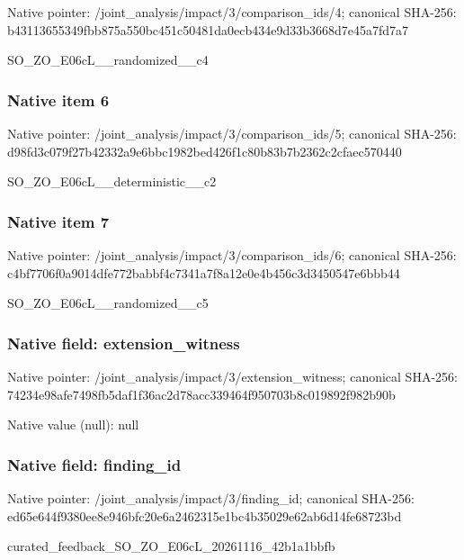\documentclass[10pt,a4paper]{article}
\begin{document}
Native pointer: /joint\_analysis/impact/3\allowbreak{}/comparison\_ids/4; canonical SHA-256: b43113655349fbb875a550bc\allowbreak{}451c50481da0ecb434e9d33b\allowbreak{}3668d7e45a7fd7a7


SO\_ZO\_E06cL\_\_randomized\_\_c4


\subsubsection{Native item 6}


Native pointer: /joint\_analysis/impact/3\allowbreak{}/comparison\_ids/5; canonical SHA-256: d98fd3c079f27b42332a9e6b\allowbreak{}bc1982bed426f1c80b83b7b2\allowbreak{}362c2cfaec570440


SO\_ZO\_E06cL\_\_deterministic\_\_c2


\subsubsection{Native item 7}


Native pointer: /joint\_analysis/impact/3\allowbreak{}/comparison\_ids/6; canonical SHA-256: c4bf7706f0a9014dfe772bab\allowbreak{}bf4c7341a7f8a12e0e4b456c\allowbreak{}3d3450547e6bbb44


SO\_ZO\_E06cL\_\_randomized\_\_c5


\subsubsection{Native field: extension\_witness}


Native pointer: /joint\_analysis/impact/3\allowbreak{}/extension\_witness; canonical SHA-256: 74234e98afe7498fb5daf1f3\allowbreak{}6ac2d78acc339464f950703b\allowbreak{}8c019892f982b90b



Native value (null): null



\subsubsection{Native field: finding\_id}


Native pointer: /joint\_analysis/impact/3/finding\_id; canonical SHA-256: ed65e644f9380ee8e946bfc2\allowbreak{}0e6a2462315e1bc4b35029e6\allowbreak{}2ab6d14fe68723bd


curated\_feedback\_SO\_ZO\_E\allowbreak{}06cL\_20261116\_42b1a1bbfb
\end{document}
